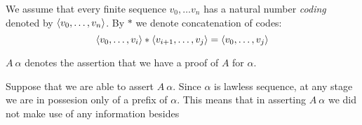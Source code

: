 \documentclass[11pt]{article}
\begin{document}
\begin{notation}
  We assume that every finite sequence $v_0, \dots v_n$ has a natural
  number \emph{coding} denoted by $\langle v_0, \dots, v_n \rangle$.
  By $*$ we denote concatenation of codes:
  \[ \langle v_0, \dots, v_i \rangle * \langle v_{i+1},  \dots, v_{j} \rangle =
      \langle v_0, \dots, v_j \rangle \]
\end{notation}

\begin{notation}
  $A\ \alpha$ denotes the assertion that we have a proof of $A$ for $\alpha$.
\end{notation}

Suppose that we are able to assert $A\ \alpha$. Since $\alpha$ is lawless
sequence, at any stage we are in possesion only of a prefix of $\alpha$. This
means that in asserting $A\ \alpha$ we did not make use of any information
besides



\end{document}
